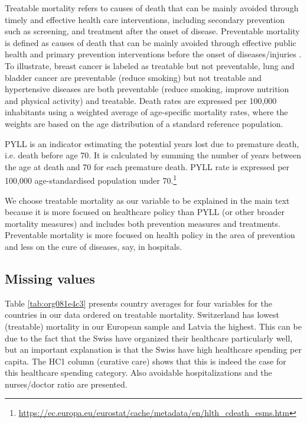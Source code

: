 \documentclass[12pt,english,a4paper]{article}
\begin{document}
Treatable mortality refers to causes of death that can be mainly avoided through timely and effective health care interventions, including secondary prevention such as screening, and treatment after the onset of disease. Preventable mortality is defined as causes of death that can be mainly avoided through effective public health and primary prevention interventions before the onset of diseases/injuries \citep{countryprofileUK}. To illustrate, breast cancer is labeled as treatable but not preventable, lung and bladder cancer are preventable (reduce smoking) but not treatable and hypertensive diseases are both preventable (reduce smoking, improve nutrition and physical activity) and treatable. Death rates are expressed per 100,000 inhabitants using a weighted average of age-specific mortality rates, where the weights are based on the age distribution of a standard reference population.

PYLL is an indicator estimating the potential years lost due to premature death, i.e. death before age 70. It is calculated by summing the number of years between the age at death and 70 for each premature death. PYLL rate is expressed per 100,000 age-standardised population under 70.\footnote{\url{https://ec.europa.eu/eurostat/cache/metadata/en/hlth\_cdeath\_esms.htm}}

We choose treatable mortality as our variable to be explained in the main text because it is more focused on healthcare policy than PYLL (or other broader mortality measures) and includes both prevention measures and treatments. Preventable mortality is more focused on health policy in the area of prevention and less on the cure of diseases, say, in hospitals.


\subsection{Missing values}
\label{sec:org738c21c}

Table \ref{tab:org081e4c3} presents country averages for four variables for the countries in our data ordered on treatable mortality. Switzerland has lowest (treatable) mortality in our European sample and Latvia the highest. This can be due to the fact that the Swiss have organized their healthcare particularly well, but an important explanation is that the Swiss have high healthcare spending per capita. The HC1 column (curative care) shows that this is indeed the case for this healthcare spending category. Also  avoidable hospitalizations and the nurses/doctor ratio are presented.
\end{document}
